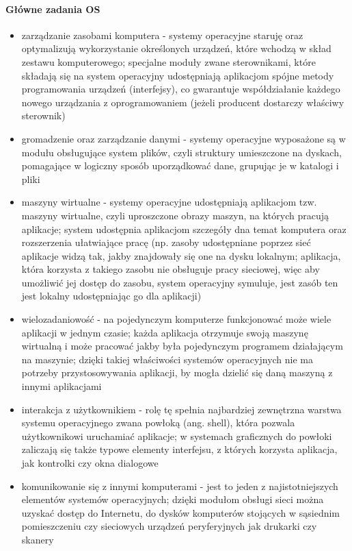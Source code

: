 \documentclass[a4paper,twoside]{report}
\begin{document}
\paragraph{Główne zadania OS}
\begin{itemize}
\item zarządzanie zasobami komputera - systemy operacyjne staruję oraz optymalizują wykorzystanie określonych urządzeń, które wchodzą w skład zestawu komputerowego; specjalne moduły zwane sterownikami, które składają się na system operacyjny udostępniają aplikacjom spójne metody programowania urządzeń (interfejsy), co gwarantuje współdziałanie każdego nowego urządzania z oprogramowaniem (jeżeli producent dostarczy właściwy sterownik)
\item gromadzenie oraz zarządzanie danymi - systemy operacyjne wyposażone są w modułu obsługujące system plików, czyli struktury umieszczone na dyskach, pomagające w logiczny sposób uporządkować dane, grupując je w katalogi i pliki
\item maszyny wirtualne - systemy operacyjne udostępniają aplikacjom tzw. maszyny wirtualne, czyli uproszczone obrazy maszyn, na których pracują aplikacje; system udostępnia aplikacjom szczegóły dna temat komputera oraz rozszerzenia ułatwiające pracę (np. zasoby udostępniane poprzez sieć aplikacje widzą tak, jakby znajdowały się one na dysku lokalnym; aplikacja, która korzysta z takiego zasobu nie obsługuje pracy sieciowej, więc aby umożliwić jej dostęp do zasobu, system operacyjny symuluje, jest zasób ten jest lokalny udostępniając go dla aplikacji)
\item wielozadaniowość - na pojedynczym komputerze funkcjonować może wiele aplikacji w jednym czasie; każda aplikacja otrzymuje swoją maszynę wirtualną i może pracować jakby była pojedynczym programem działającym na maszynie; dzięki takiej właściwości systemów operacyjnych nie ma potrzeby przystosowywania aplikacji, by mogła dzielić się daną maszyną z innymi aplikacjami
\item interakcja z użytkownikiem - rolę tę spełnia najbardziej zewnętrzna warstwa systemu operacyjnego zwana powłoką (ang. shell), która pozwala użytkownikowi uruchamiać aplikacje; w systemach graficznych do powłoki zaliczają się także typowe elementy interfejsu, z których korzysta aplikacja, jak kontrolki czy okna dialogowe
\item komunikowanie się z innymi komputerami - jest to jeden z najistotniejszych elementów systemów operacyjnych; dzięki modułom obsługi sieci można uzyskać dostęp do Internetu, do dysków komputerów stojących w sąsiednim pomieszczeniu czy sieciowych urządzeń peryferyjnych jak drukarki czy skanery
\end{itemize}
\end{document}
